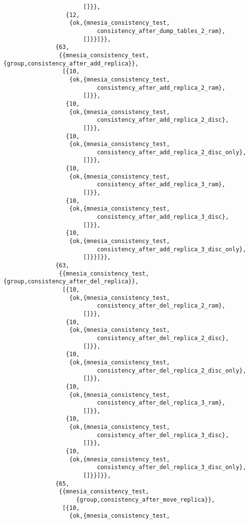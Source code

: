 \begin{verbatim}
                       []}},
                  {12,
                   {ok,{mnesia_consistency_test,
                           consistency_after_dump_tables_2_ram},
                       []}}]}},
               {63,
                {{mnesia_consistency_test,{group,consistency_after_add_replica}},
                 [{10,
                   {ok,{mnesia_consistency_test,
                           consistency_after_add_replica_2_ram},
                       []}},
                  {10,
                   {ok,{mnesia_consistency_test,
                           consistency_after_add_replica_2_disc},
                       []}},
                  {10,
                   {ok,{mnesia_consistency_test,
                           consistency_after_add_replica_2_disc_only},
                       []}},
                  {10,
                   {ok,{mnesia_consistency_test,
                           consistency_after_add_replica_3_ram},
                       []}},
                  {10,
                   {ok,{mnesia_consistency_test,
                           consistency_after_add_replica_3_disc},
                       []}},
                  {10,
                   {ok,{mnesia_consistency_test,
                           consistency_after_add_replica_3_disc_only},
                       []}}]}},
               {63,
                {{mnesia_consistency_test,{group,consistency_after_del_replica}},
                 [{10,
                   {ok,{mnesia_consistency_test,
                           consistency_after_del_replica_2_ram},
                       []}},
                  {10,
                   {ok,{mnesia_consistency_test,
                           consistency_after_del_replica_2_disc},
                       []}},
                  {10,
                   {ok,{mnesia_consistency_test,
                           consistency_after_del_replica_2_disc_only},
                       []}},
                  {10,
                   {ok,{mnesia_consistency_test,
                           consistency_after_del_replica_3_ram},
                       []}},
                  {10,
                   {ok,{mnesia_consistency_test,
                           consistency_after_del_replica_3_disc},
                       []}},
                  {10,
                   {ok,{mnesia_consistency_test,
                           consistency_after_del_replica_3_disc_only},
                       []}}]}},
               {65,
                {{mnesia_consistency_test,
                     {group,consistency_after_move_replica}},
                 [{10,
                   {ok,{mnesia_consistency_test,

\end{verbatim}

